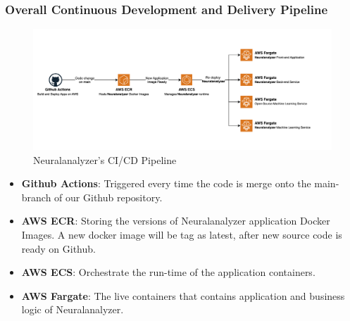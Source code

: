 \documentclass[12pt]{article}
\begin{document}
\subsubsection{Overall Continuous Development and Delivery Pipeline}

\begin{figure}[h!]
  \centering
  \includegraphics[width=1\textwidth]{app-build-pipeline.png}
  \caption{Neuralanalyzer's CI/CD Pipeline}
  \label{fig:overall-ci-cd-infra}
\end{figure}

\begin{itemize}
    \item \textbf{Github Actions}: Triggered every time the code is merge onto the main-branch of our Github repository.
    \item \textbf{AWS ECR}: Storing the versions of Neuralanalyzer application Docker Images. A new docker image will be tag as latest, after new source code is ready on Github.
    \item \textbf{AWS ECS}: Orchestrate the run-time of the application containers.
    \item \textbf{AWS Fargate}: The live containers that contains application and business logic of Neuralanalyzer.
\end{itemize}
\end{document}
